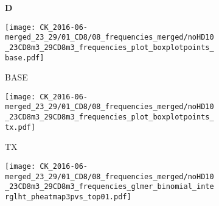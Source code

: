 \documentclass[a4paper, 12pt]{article}
\begin{document}
\begin{figure}[!thb]
\centering

    \caption{Frequencies CD8}
    \begin{subfigure}[t]{0.02\textwidth}
    \vskip 0pt
        \textbf{\textsf{\normalsize D}}
    \end{subfigure}
    \begin{subfigure}[t]{0.45\textwidth}
    \vskip 0pt
    \caption{BASE}
        \texttt{[image: CK\_2016-06-merged\_23\_29/01\_CD8/08\_frequencies\_merged/noHD10\_23CD8m3\_29CD8m3\_frequencies\_plot\_boxplotpoints\_base.pdf]}
    \end{subfigure}
    \quad
        \begin{subfigure}[t]{0.02\textwidth}
    \vskip 0pt
        \textbf{\textsf{\normalsize }}
    \end{subfigure}
    \begin{subfigure}[t]{0.45\textwidth}
    \vskip 0pt
    \caption{TX}
        \texttt{[image: CK\_2016-06-merged\_23\_29/01\_CD8/08\_frequencies\_merged/noHD10\_23CD8m3\_29CD8m3\_frequencies\_plot\_boxplotpoints\_tx.pdf]}
    \end{subfigure}

    \begin{subfigure}[t]{0.02\textwidth}
    \vskip 0pt
        \textbf{\textsf{\normalsize }}
    \end{subfigure}
    \begin{subfigure}[t]{0.5\textwidth}
    \vskip 0pt
    \caption{}
        \texttt{[image: CK\_2016-06-merged\_23\_29/01\_CD8/08\_frequencies\_merged/noHD10\_23CD8m3\_29CD8m3\_frequencies\_glmer\_binomial\_interglht\_pheatmap3pvs\_top01.pdf]}
    \end{subfigure}


\end{figure}
\end{document}
